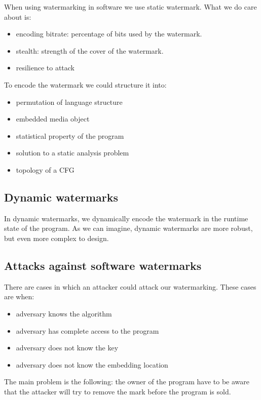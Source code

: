 When using watermarking in software we use static watermark. What we do care about is: 

\begin{itemize}
    \item encoding bitrate: percentage of bits used by the watermark. 
    \item stealth: strength of the cover of the watermark.
    \item resilience to attack
\end{itemize}

To encode the watermark we could structure it into: 

\begin{itemize}
    \item permutation of language structure
    \item embedded media object
    \item statistical property of the program
    \item solution to a static analysis problem
    \item topology of a CFG
\end{itemize}


\subsection{Dynamic watermarks}

In dynamic watermarks, we dynamically encode the watermark in the runtime state of the program. As we can imagine, dynamic watermarks are more robust, but even more complex to design.

\subsection{Attacks against software watermarks}

There are cases in which an attacker could attack our watermarking. These cases are when: 
\begin{itemize}
    \item adversary knows the algorithm
    \item adversary has complete access to the program
    \item adversary does not know the key
    \item adversary does not know the embedding location
\end{itemize}


The main problem is the following: the owner of the program have to be aware that the attacker will try to remove the mark before the program is sold. \newline 

